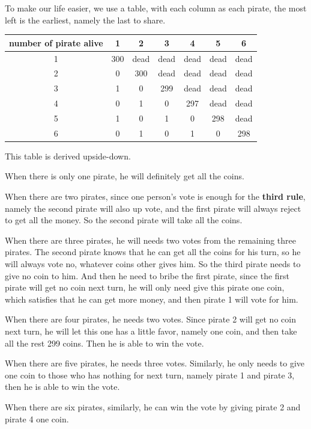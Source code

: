 \documentclass[A4paper]{article}
\begin{document}
\par To make our life easier, we use a table, with each column as each pirate, the most left is the earliest, namely the last to share.
\begin{table}[!htbp]
\centering
\begin{tabular}{|c|c|c|c|c|c|c|}
\hline
number of pirate alive & 1 & 2 & 3 & 4 & 5 & 6 \\ \hline
1 & 300 & dead & dead & dead & dead & dead \\
2 & 0 & 300 & dead & dead & dead & dead\\
3 & 1 & 0 & 299 & dead & dead & dead \\
4 & 0 & 1 & 0 & 297 & dead & dead \\
5 & 1 & 0 & 1 & 0 & 298 & dead \\
6 & 0 & 1 & 0 & 1 & 0 & 298 \\
\hline
\end{tabular}
\end{table}
This table is derived upside-down. 
\par When there is only one pirate, he will definitely get all the coins.
\par When there are two pirates, since one person's vote is enough for the \textbf{third rule}, namely the second pirate will also up vote, and the first pirate will always reject to get all the money. So the second pirate will take all the coins.
\par When there are three pirates, he will needs two votes from the remaining three pirates. The second pirate knows that he can get all the coins for his turn, so he will always vote no, whatever coins other gives him. So the third pirate needs to give no coin to him. And then he need to bribe the first pirate, since the first pirate will get no coin next turn, he will only need give this pirate one coin, which satisfies that he can get more money, and then pirate 1 will vote for him. 
\par When there are four pirates, he needs two votes. Since pirate 2 will get no coin next turn, he will let this one has a little favor, namely one coin, and then take all the rest 299 coins. Then he is able to win the vote.
\par When there are five pirates, he needs three votes. Similarly, he only needs to give one coin to those who has nothing for next turn, namely pirate 1 and pirate 3, then he is able to win the vote.
\par When there are six pirates, similarly, he can win the vote by giving pirate 2 and pirate 4 one coin.
\end{document}
